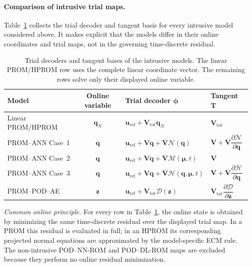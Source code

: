 \documentclass[11pt]{article}
\begin{document}
\paragraph{Comparison of intrusive trial maps.}
Table~\ref{tab:intrusive-trial-maps} collects the trial decoder and tangent
basis for every intrusive model considered above.  It makes explicit that the
models differ in their online coordinates and trial maps, not in the governing
time-discrete residual.
\begin{table}[H]
\centering
\caption{Trial decoders and tangent bases of the intrusive models.  The
linear PROM/HPROM row uses the complete linear coordinate vector.  The
remaining rows solve only their displayed online variable.}
\label{tab:intrusive-trial-maps}
\small
\setlength{\tabcolsep}{4pt}
\renewcommand{\arraystretch}{1.25}
\begin{tabular}{@{}l c l l@{}}
\toprule
Model & Online variable & Trial decoder $\boldsymbol\phi$ & Tangent $\mathbf T$ \\
\midrule
Linear PROM/HPROM
& $\mathbf q_N$
& $\mathbf u_{\mathrm{ref}}+\mathbf V_{\mathrm{tot}}\mathbf q_N$
& $\mathbf V_{\mathrm{tot}}$ \\
PROM--ANN Case~1
& $\mathbf q$
& $\mathbf u_{\mathrm{ref}}+\mathbf V\mathbf q+
   \overline{\mathbf V}\mathcal N(\mathbf q)$
& $\mathbf V+\overline{\mathbf V}\dfrac{\partial\mathcal N}{\partial\mathbf q}$ \\
PROM--ANN Case~2
& $\mathbf q$
& $\mathbf u_{\mathrm{ref}}+\mathbf V\mathbf q+
   \overline{\mathbf V}\mathcal M(\bm\mu,t)$
& $\mathbf V$ \\
PROM--ANN Case~3
& $\mathbf q$
& $\mathbf u_{\mathrm{ref}}+\mathbf V\mathbf q+
   \overline{\mathbf V}\mathcal H(\mathbf q,\bm\mu,t)$
& $\mathbf V+\overline{\mathbf V}\dfrac{\partial\mathcal H}{\partial\mathbf q}$ \\
PROM--POD--AE
& $\mathbf z$
& $\mathbf u_{\mathrm{ref}}+\mathbf V_{\mathrm{tot}}\mathcal D(\mathbf z)$
& $\mathbf V_{\mathrm{tot}}\dfrac{\partial\mathcal D}{\partial\mathbf z}$ \\
\bottomrule
\end{tabular}
\end{table}
\noindent\emph{Common online principle.} For every row in
Table~\ref{tab:intrusive-trial-maps}, the online state is obtained by
minimizing the same time-discrete residual over the displayed trial map.  In a
PROM this residual is evaluated in full; in an HPROM its corresponding
projected normal equations are approximated by the model-specific ECM rule.
The non-intrusive POD--NN-ROM and POD--DL-ROM maps are excluded because they
perform no online residual minimization.
\end{document}
